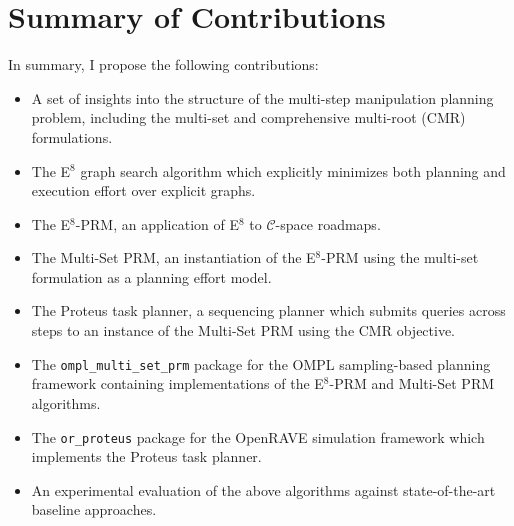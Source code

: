 \section*{Summary of Contributions}

In summary,
I propose the following contributions:
\begin{itemize}
\itemsep-3pt
\item A set of insights into the structure of the
   multi-step manipulation planning problem,
   including the multi-set and comprehensive multi-root (CMR)
   formulations.
\item The E$^8$ graph search algorithm which explicitly minimizes
   both planning and execution effort over explicit graphs.
\item The E$^8$-PRM, an application of E$^8$ to
   $\mathcal{C}$-space roadmaps.
\item The Multi-Set PRM, an instantiation of the E$^8$-PRM
   using the multi-set formulation as a planning effort model.
\item The {\sc Proteus} task planner,
   a sequencing planner which submits queries across steps
   to an instance of the Multi-Set PRM using the CMR objective.
\item The {\tt ompl\_multi\_set\_prm} package
   for the OMPL\citep{sucan2012ompl} sampling-based planning framework
   containing implementations of the E$^8$-PRM and Multi-Set PRM
   algorithms.
\item The {\tt or\_proteus} package for the
   OpenRAVE\citep{diankov2010openrave} simulation framework
   which implements the {\sc Proteus} task planner.
\item An experimental evaluation of the above algorithms against
   state-of-the-art baseline approaches.
\end{itemize}

